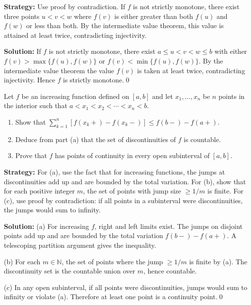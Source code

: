 \noindent\textbf{Strategy:} Use proof by contradiction. If $f$ is not strictly monotone, there exist three points $u < v < w$ where $f(v)$ is either greater than both $f(u)$ and $f(w)$ or less than both. By the intermediate value theorem, this value is attained at least twice, contradicting injectivity.

\bigskip\noindent\textbf{Solution:}
If $f$ is not strictly monotone, there exist $a\le u<v<w\le b$ with either $f(v)>\max\{f(u),f(w)\}$ or $f(v)<\min\{f(u),f(w)\}$. By the intermediate value theorem the value $f(v)$ is taken at least twice, contradicting injectivity. Hence $f$ is strictly monotone.\qed



\begin{problembox}
Let $f$ be an increasing function defined on $[a, b]$ and let $x_1, \ldots, x_n$ be $n$ points in the interior such that $a < x_1 < x_2 < \cdots < x_n < b$.
\begin{enumerate}[label=(\alph*)]
\item Show that $\sum_{k=1}^n [f(x_k+) - f(x_k-)] \leq f(b-) - f(a+)$.
\item Deduce from part (a) that the set of discontinuities of $f$ is countable.
\item Prove that $f$ has points of continuity in every open subinterval of $[a, b]$.
\end{enumerate}
\end{problembox}

\noindent\textbf{Strategy:} For (a), use the fact that for increasing functions, the jumps at discontinuities add up and are bounded by the total variation. For (b), show that for each positive integer $m$, the set of points with jump size $\geq 1/m$ is finite. For (c), use proof by contradiction: if all points in a subinterval were discontinuities, the jumps would sum to infinity.

\bigskip\noindent\textbf{Solution:}
(a) For increasing $f$, right and left limits exist. The jumps on disjoint points add up and are bounded by the total variation $f(b-)-f(a+)$. A telescoping partition argument gives the inequality.

(b) For each $m\in\mathbb{N}$, the set of points where the jump $\ge 1/m$ is finite by (a). The discontinuity set is the countable union over $m$, hence countable.

(c) In any open subinterval, if all points were discontinuities, jumps would sum to infinity or violate (a). Therefore at least one point is a continuity point.\qed



